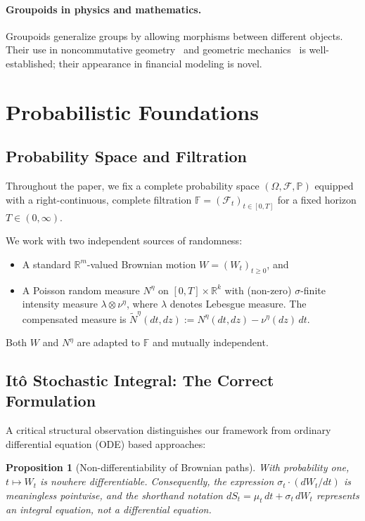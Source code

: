 \documentclass[12pt,a4paper]{article}
\theoremstyle{plain}
\newtheorem{proposition}[theorem]{Proposition}
\theoremstyle{definition}
\newcommand{\R}{\mathbb{R}}
\newcommand{\PP}{\mathbb{P}}
\newcommand{\F}{\mathcal{F}}
\newcommand{\1}{\mathbbm{1}}
\begin{document}
\paragraph{Groupoids in physics and mathematics.}
Groupoids generalize groups by allowing morphisms between different objects.
Their use in noncommutative geometry~\citep{Connes1994} and geometric
mechanics~\citep{Weinstein1996} is well-established; their appearance in
financial modeling is novel.

\section{Probabilistic Foundations}
\label{sec:prelim}

\subsection{Probability Space and Filtration}

Throughout the paper, we fix a complete probability space
$(\Omega, \F, \PP)$ equipped with a right-continuous, complete filtration
$\mathbb{F} = (\F_t)_{t \in [0,T]}$ for a fixed horizon $T \in (0,\infty)$.

We work with two independent sources of randomness:
\begin{itemize}
  \item A standard $\R^m$-valued Brownian motion $W = (W_t)_{t \geq 0}$, and
  \item A Poisson random measure $N^\eta$ on $[0,T] \times \R^k$ with
        (non-zero) $\sigma$-finite intensity measure $\lambda \otimes \nu^\eta$,
        where $\lambda$ denotes Lebesgue measure. The compensated measure is
        $\tilde{N}^\eta(dt,dz) := N^\eta(dt,dz) - \nu^\eta(dz)\,dt$.
\end{itemize}
Both $W$ and $N^\eta$ are adapted to $\mathbb{F}$ and mutually independent.

\subsection{Itô Stochastic Integral: The Correct Formulation}

A critical structural observation distinguishes our framework from ordinary
differential equation (ODE) based approaches:

\begin{proposition}[Non-differentiability of Brownian paths]
\label{prop:nondiff}
With probability one, $t \mapsto W_t$ is nowhere differentiable. Consequently,
the expression $\sigma_t \cdot (dW_t/dt)$ is meaningless pointwise, and the
shorthand notation $dS_t = \mu_t\,dt + \sigma_t\,dW_t$ represents an
\emph{integral equation}, not a differential equation.
\end{proposition}
\end{document}
